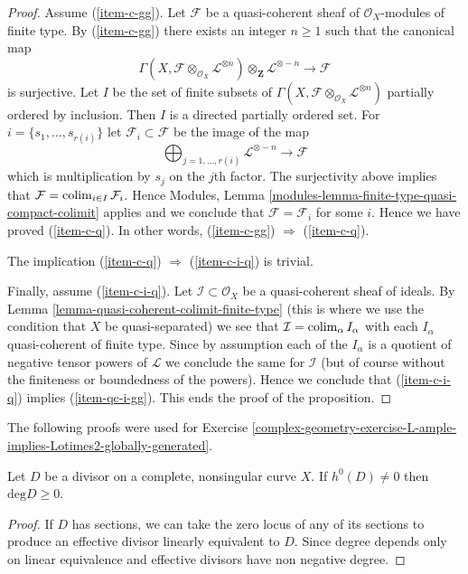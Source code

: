 \begin{proof}
\medskip\noindent
Assume (\ref{item-c-gg}). Let $\mathcal{F}$ be a quasi-coherent
sheaf of $\mathcal{O}_X$-modules of finite type.
By (\ref{item-c-gg}) there exists an integer $n \geq 1$ such that
the canonical map
$$
\Gamma(X, \mathcal{F} \otimes_{\mathcal{O}_X} \mathcal{L}^{\otimes n})
\otimes_{\mathbf{Z}} \mathcal{L}^{\otimes -n}
\longrightarrow
\mathcal{F}
$$
is surjective. Let $I$ be the set of finite subsets of
$\Gamma(X, \mathcal{F} \otimes_{\mathcal{O}_X} \mathcal{L}^{\otimes n})$
partially ordered by inclusion. Then $I$ is a directed partially ordered set.
For $i = \{s_1, \ldots, s_{r(i)}\}$ let $\mathcal{F}_i \subset \mathcal{F}$
be the image of the map
$$
\bigoplus\nolimits_{j = 1, \ldots, r(i)} \mathcal{L}^{\otimes -n}
\longrightarrow
\mathcal{F}
$$
which is multiplication by $s_j$ on the $j$th factor. The surjectivity above
implies that $\mathcal{F} = \mathop{\mathrm{colim}}\nolimits_{i \in I} \mathcal{F}_i$.
Hence Modules, Lemma \ref{modules-lemma-finite-type-quasi-compact-colimit}
applies and we conclude that
$\mathcal{F} = \mathcal{F}_i$ for some $i$.
Hence we have proved (\ref{item-c-q}). In other words,
(\ref{item-c-gg}) $\Rightarrow$ (\ref{item-c-q}).

\medskip\noindent
The implication (\ref{item-c-q}) $\Rightarrow$ (\ref{item-c-i-q}) is trivial.

\medskip\noindent
Finally, assume (\ref{item-c-i-q}).
Let $\mathcal{I} \subset \mathcal{O}_X$ be a quasi-coherent sheaf
of ideals. By Lemma \ref{lemma-quasi-coherent-colimit-finite-type}
(this is where we use the condition that $X$ be quasi-separated)
we see that $\mathcal{I} = \mathop{\mathrm{colim}}\nolimits_\alpha I_\alpha$ with
each $I_\alpha$ quasi-coherent of finite type. Since by assumption each of
the $I_\alpha$ is a quotient of negative tensor powers of
$\mathcal{L}$ we conclude the same for $\mathcal{I}$ (but of course
without the finiteness or boundedness of the powers). Hence
we conclude that (\ref{item-c-i-q}) implies (\ref{item-qc-i-gg}).
This ends the proof of the proposition.
\end{proof}

The following proofs were used for Exercise 
\ref{complex-geometry-exercise-L-ample-implies-Lotimes2-globally-generated}.

\begin{lemma}
\label{lemma-divisor-has-sections-implies-deg-geq-0}
Let $D$ be a divisor on a complete, nonsingular curve $X$. 
If  $h^0(D)\neq 0$ then $\text{deg}D\geq0$.
\end{lemma}

\begin{proof}
If $D$ has sections, we can take the zero locus of any of its sections to
produce an effective divisor linearly equivalent to $D$. Since degree depends
only on linear equivalence and effective divisors have non negative degree.
\end{proof}

